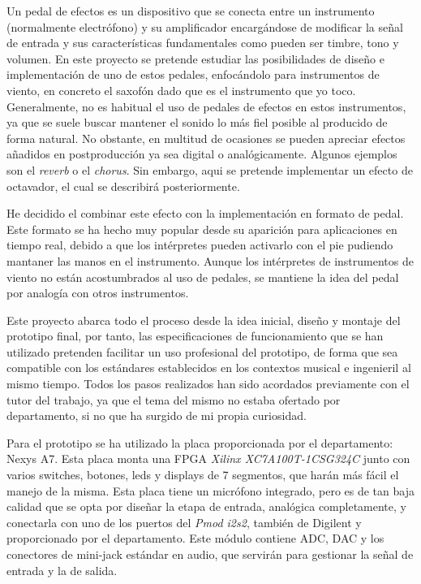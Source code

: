 Un pedal de efectos es un dispositivo que se conecta entre un instrumento (normalmente electrófono) y su amplificador encargándose de modificar la señal de entrada y sus características fundamentales como pueden ser timbre, tono y volumen. En este proyecto se pretende estudiar las posibilidades de diseño e implementación de uno de estos pedales, enfocándolo para instrumentos de viento, en concreto el saxofón dado que es el instrumento que yo toco. Generalmente, no es habitual el uso de pedales de efectos en estos instrumentos, ya que se suele buscar mantener el sonido lo más fiel posible al producido de forma natural. No obstante, en multitud de ocasiones se pueden apreciar efectos añadidos en postproducción ya sea digital o analógicamente. Algunos ejemplos son el \emph{reverb} o el \emph{chorus}. Sin embargo, aqui se pretende implementar un efecto de octavador, el cual se describirá posteriormente.

He decidido el combinar este efecto con la implementación en formato de pedal. Este formato se ha hecho muy popular desde su aparición para aplicaciones en tiempo real, debido a que los intérpretes pueden activarlo con el pie pudiendo mantaner las manos en el instrumento. Aunque los intérpretes de instrumentos de viento no están acostumbrados al uso de pedales, se mantiene la idea del pedal por analogía con otros instrumentos.

Este proyecto abarca todo el proceso desde la idea inicial, diseño y montaje del prototipo final, por tanto, las especificaciones de funcionamiento que se han utilizado pretenden facilitar un uso profesional del prototipo, de forma que sea compatible con los estándares establecidos en los contextos musical e ingenieril al mismo tiempo. Todos los pasos realizados han sido acordados previamente con el tutor del trabajo, ya que el tema del mismo no estaba ofertado por departamento, si no que ha surgido de mi propia curiosidad.

Para el prototipo se ha utilizado la placa proporcionada por el departamento: Nexys A7. Esta placa monta una FPGA \emph{Xilinx XC7A100T-1CSG324C} junto con varios switches, botones, leds y displays de 7 segmentos, que harán más fácil el manejo de la misma. Esta placa tiene un micrófono integrado, pero es de tan baja calidad que se opta por diseñar la etapa de entrada, analógica completamente, y conectarla con uno de los puertos del \emph{Pmod i2s2}, también de Digilent y proporcionado por el departamento. Este módulo contiene ADC, DAC y los conectores de mini-jack estándar en audio, que servirán para gestionar la señal de entrada y la de salida.

